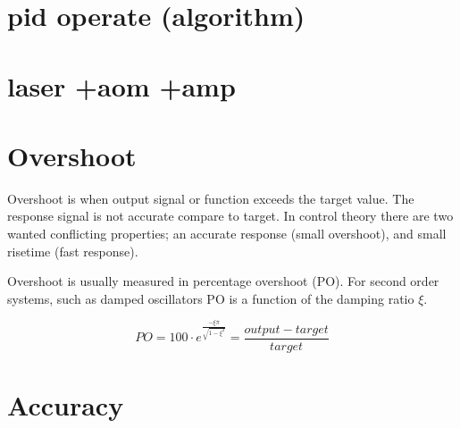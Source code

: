\documentclass[\main/master.tex]{subfiles}
\begin{document}
\section{pid operate (algorithm)}
\section{laser +aom +amp}
\doublespacing



\section{Overshoot}
Overshoot is when output signal or function exceeds the target value. The response signal is not accurate compare to target. In control theory there are two wanted conflicting properties; an accurate response (small overshoot), and small risetime (fast response). 
\par\noindent
Overshoot is usually measured in percentage overshoot (PO). For second order systems, such as damped oscillators PO is a function of the damping ratio $\xi$. 


\begin{equation}
PO = 100\cdot e ^{\frac{-\xi\pi}{\sqrt{1-\xi^2}}} = \frac{output-target}{target}   \label{eqn:percentage_overshoot}
\end{equation}
 
\section{Accuracy}
\end{document}
